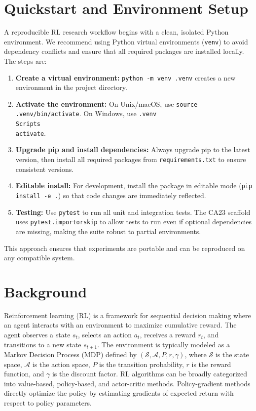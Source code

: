 \documentclass[11pt]{article}
\begin{document}
\section{Quickstart and Environment Setup}
A reproducible RL research workflow begins with a clean, isolated Python environment. We recommend using Python virtual environments (\texttt{venv}) to avoid dependency conflicts and ensure that all required packages are installed locally. The steps are:
\begin{enumerate}
  \item \textbf{Create a virtual environment:} \texttt{python -m venv .venv} creates a new environment in the project directory.
  \item \textbf{Activate the environment:} On Unix/macOS, use \texttt{source .venv/bin/activate}. On Windows, use \texttt{.venv\\Scripts\\activate}.
  \item \textbf{Upgrade pip and install dependencies:} Always upgrade pip to the latest version, then install all required packages from \texttt{requirements.txt} to ensure consistent versions.
  \item \textbf{Editable install:} For development, install the package in editable mode (\texttt{pip install -e .}) so that code changes are immediately reflected.
  \item \textbf{Testing:} Use \texttt{pytest} to run all unit and integration tests. The CA23 scaffold uses \texttt{pytest.importorskip} to allow tests to run even if optional dependencies are missing, making the suite robust to partial environments.
\end{enumerate}
This approach ensures that experiments are portable and can be reproduced on any compatible system.

\section{Background}
Reinforcement learning (RL) is a framework for sequential decision making where an agent interacts with an environment to maximize cumulative reward. The agent observes a state $s_t$, selects an action $a_t$, receives a reward $r_t$, and transitions to a new state $s_{t+1}$. The environment is typically modeled as a Markov Decision Process (MDP) defined by $(\mathcal{S}, \mathcal{A}, P, r, \gamma)$, where $\mathcal{S}$ is the state space, $\mathcal{A}$ is the action space, $P$ is the transition probability, $r$ is the reward function, and $\gamma$ is the discount factor. RL algorithms can be broadly categorized into value-based, policy-based, and actor-critic methods. Policy-gradient methods directly optimize the policy by estimating gradients of expected return with respect to policy parameters.
\end{document}
